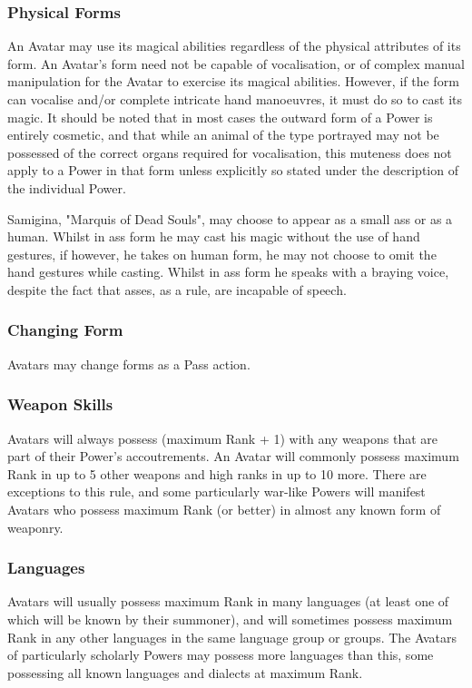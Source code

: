 \subsubsection{Physical Forms}
An Avatar may use its magical abilities regardless of the physical
attributes of its form.  An Avatar's form need not be capable of
vocalisation, or of complex manual manipulation for the Avatar to
exercise its magical abilities.  However, if the form can vocalise
and/or complete intricate hand manoeuvres, it must do so to cast its
magic.  It should be noted that in most cases the outward form of a
Power is entirely cosmetic, and that while an animal of the type
portrayed may not be possessed of the correct organs required for
vocalisation, this muteness does not apply to a Power in that form
unless explicitly so stated under the description of the individual
Power.

\begin{example}
Samigina, "Marquis of Dead Souls", may choose to appear as a small ass
or as a human.  Whilst in ass form he may cast his magic without the
use of hand gestures, if however, he takes on human form, he may not
choose to omit the hand gestures while casting.  Whilst in ass form he
speaks with a braying voice, despite the fact that asses, as a rule,
are incapable of speech.
\end{example}

\subsubsection{Changing Form}
Avatars may change forms as a Pass action.

\subsubsection{Weapon Skills}
Avatars will always possess (maximum Rank + 1) with any weapons that
are part of their Power's accoutrements. An Avatar will commonly
possess maximum Rank in up to 5 other weapons and high ranks in up to
10 more. There are exceptions to this rule, and some particularly
war-like Powers will manifest Avatars who possess maximum Rank (or
better) in almost any known form of weaponry.

\subsubsection{Languages}
Avatars will usually possess maximum Rank in many languages (at least
one of which will be known by their summoner), and will sometimes
possess maximum Rank in any other languages in the same language group
or groups.  The Avatars of particularly scholarly Powers may possess
more languages than this, some possessing all known languages and
dialects at maximum Rank.

